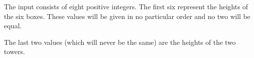 The input consists of eight positive integers. The first six represent the heights of the six boxes. 
These values will be given in no particular order and no two will be equal.

The last two values (which will never be the same) are the heights of the two towers.
